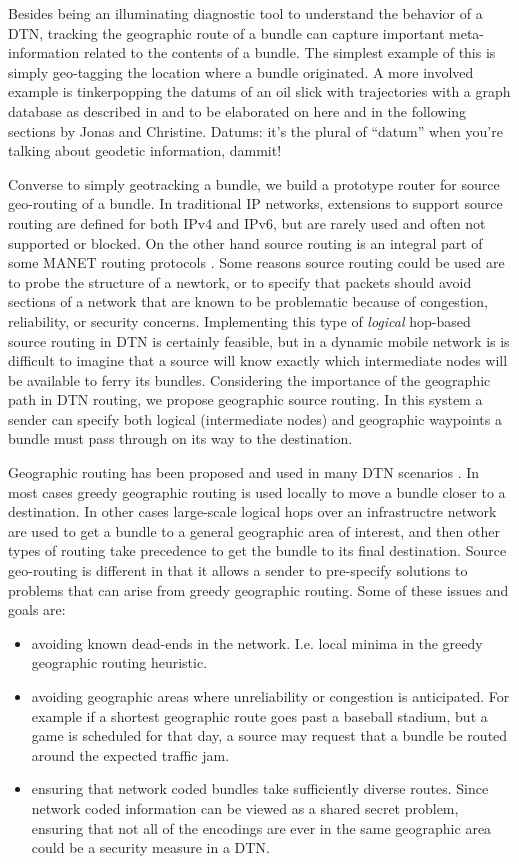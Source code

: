 \documentclass{sig-alternate}
\begin{document}
Besides being an illuminating diagnostic tool to understand the behavior of a DTN, tracking the geographic route of a bundle can capture important meta-information related to the contents of a bundle.  The simplest example of this is simply geo-tagging the location where a bundle originated.  A more involved example is tinkerpopping the datums of an oil slick with trajectories with a graph database as described in \cite{jonas-paper} and to be elaborated on here and in the following sections by Jonas and Christine.  Datums: it's the plural of ``datum'' when you're talking about geodetic information, dammit!

Converse to simply geotracking a bundle, we build a prototype router for source geo-routing of a bundle.  In traditional IP networks, extensions to support source routing are defined for both IPv4 and IPv6, but are rarely used and often not supported or blocked.  On the other hand source routing is an integral part of some MANET routing protocols \cite{some-DSR-paper}.  Some reasons source routing could be used are to probe the structure of a newtork, or to specify that packets should avoid sections of a network that are known to be problematic because of congestion, reliability, or security concerns.  Implementing this type of {\it logical} hop-based source routing in DTN is certainly feasible, but in a dynamic mobile network is is difficult to imagine that a source will know exactly which intermediate nodes will be available to ferry its bundles.  Considering the importance of the geographic path in DTN routing, we propose geographic source routing.  In this system a sender can specify both logical (intermediate nodes) and geographic waypoints a bundle must pass through on its way to the destination.

Geographic routing has been proposed and used in many DTN scenarios \cite{paper1,paper2,paper3,paper4,paper5,paper6}.  In most cases greedy geographic routing is used locally to move a bundle closer to a destination.  In other cases large-scale logical hops over an infrastructre network are used to get a bundle to a general geographic area of interest, and then other types of routing take precedence to get the bundle to its final destination.  Source geo-routing is different in that it allows a sender to pre-specify solutions to problems that can arise from greedy geographic routing.  Some of these issues and goals are:
\begin{itemize}
  \item avoiding known dead-ends in the network. I.e. local minima in the greedy geographic routing heuristic.
  \item avoiding geographic areas where unreliability or congestion is anticipated.  For example if a shortest geographic route goes past a baseball stadium, but a game is scheduled for that day, a source may request that a bundle be routed around the expected traffic jam.
  \item ensuring that network coded bundles take sufficiently diverse routes.  Since network coded information can be viewed as a shared secret problem, ensuring that not all of the encodings are ever in the same geographic area could be a security measure in a DTN.
\end{itemize}
\end{document}
